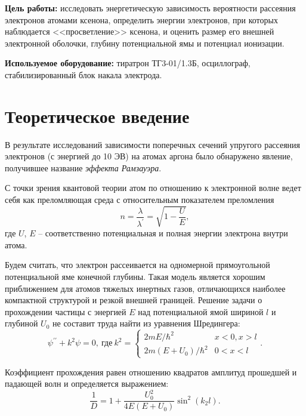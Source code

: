 \textbf{Цель работы:} исследовать энергетическую зависимость вероятности рассеяния электронов атомами ксенона, 
определить энергии электронов, при которых наблюдается <<просветление>> ксенона, и оценить размер его внешней электронной оболочки, 
глубину потенциальной ямы и потенциал ионизации.

\textbf{Используемое оборудование:} тиратрон ТГ3-01/1.3Б, осциллограф, стабилизированный блок накала электрода.  

\section{Теоретическое введение}

	В результате исследований зависимости поперечных сечений упругого рассеяния электронов (с энергией до 10 ЭВ) 
	на атомах аргона было обнаружено явление, получившее название \textit{эффекта Рамзауэра}.
		
	С точки зрения квантовой теории атом по отношению к электронной волне ведет себя 
	как преломляющая среда с относительным показателем преломления
		\begin{equation}
			n = \frac{\lambda}{\lambda^\prime} = \sqrt{1-\frac{U}{E}},
		\end{equation}
	где $U$, $E$ -- соответственно потенциальная и полная энергии электрона внутри атома.
		
	Будем считать, что электрон рассеивается на одномерной прямоугольной потенциальной яме конечной глубины. 
	Такая модель является хорошим приближением для атомов тяжелых инертных газов, отличающихся наиболее компактной структурой и резкой внешней границей. 
	Решение задачи о прохождении частицы с энергией $E$ над потенциальной ямой шириной $l$ и глубиной $U_0$ не составит труда найти из уравнения Шредингера:\\
		\begin{equation}
			\psi^{\prime\prime}+k^2\psi=0, \ \text{где}\
			k^2 =\begin{cases}
				2mE/\hbar^2 & x<0, x>l\\
				2m(E+U_0)/\hbar^2 & 0<x<l
			\end{cases}.
		\end{equation}

	Коэффициент прохождения равен отношению квадратов амплитуд прошедшей и падающей волн и определяется выражением:
		\begin{equation}
			\frac{1}{D} = 1 + \frac{U_0^2}{4E(E+U_0)}\sin^2(k_2l).
		\end{equation}

